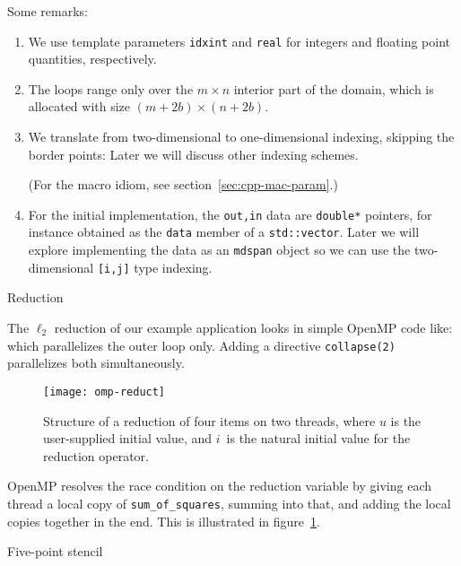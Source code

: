 Some remarks:
\begin{enumerate}
\item We use template parameters \lstinline{idxint} and \lstinline{real}
  for integers and floating point quantities, respectively.
\item
  The loops range only over the $m\times n$ interior part of the domain,
  which is allocated with size $(m+2b)\times(n+2b)$.
\item We  translate from two-dimensional
  to one-dimensional indexing, skipping the border points:
  Later we will discuss other indexing schemes.
\begin{packt}
    (For the macro idiom, see section~\ref{sec:cpp-mac-param}.)
\end{packt}
\item
  For the initial implementation, the \lstinline{out,in} data
  are \lstinline{double*} pointers, for instance obtained
  as the \lstinline{data} member of a \lstinline{std::vector}.
  Later we will explore implementing the data as an \lstinline{mdspan} object
  so we can use the two-dimensional \lstinline{[i,j]} type indexing.
\end{enumerate}

 {Reduction}

The $\ell_2$ reduction of our example application
looks in simple OpenMP code like:
%
%
which parallelizes the outer loop only.
Adding a directive \lstinline[language=omp]{collapse(2)}
parallelizes both simultaneously.



\begin{figure}[t]
  \texttt{[image: omp-reduct]}
  \caption{Structure of a reduction of four items on two threads,
    where $u$ is the user-supplied initial value,
    and $i$~is the natural initial value for the reduction operator.}
  \label{fig:omp-reduct}
\end{figure}


OpenMP resolves the race condition on the reduction variable
by giving each thread a local copy of \lstinline{sum_of_squares},
summing into that, and adding the local copies together in the end.
This is illustrated in figure~\ref{fig:omp-reduct}.

 {Five-point stencil}
\label{sec:d2d-5pt}

